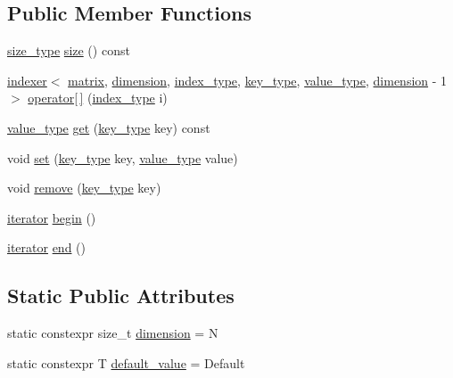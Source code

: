 \subsection*{Public Member Functions}
\begin{DoxyCompactItemize}
\item 
\hyperlink{structmatrix_a1a99bcb39d34cb8acd10a5d1a260542b}{size\+\_\+type} \hyperlink{structmatrix_abbe65fbc728f4958ad972a16d94716af}{size} () const
\item 
\hyperlink{structindexer}{indexer}$<$ \hyperlink{structmatrix}{matrix}, \hyperlink{structmatrix_ad9335b977ea0dfdd152314be10591379}{dimension}, \hyperlink{structmatrix_aa800607a99454f7d958b4d6565ca9751}{index\+\_\+type}, \hyperlink{structmatrix_ae7906bda02f5d7f6744d9545c9465e13}{key\+\_\+type}, \hyperlink{structmatrix_aeb660563444929ee10d8a0b06d42a951}{value\+\_\+type}, \hyperlink{structmatrix_ad9335b977ea0dfdd152314be10591379}{dimension} -\/ 1 $>$ \hyperlink{structmatrix_ac66c50d40fa11e89c81197da2499fe1b}{operator\mbox{[}$\,$\mbox{]}} (\hyperlink{structmatrix_aa800607a99454f7d958b4d6565ca9751}{index\+\_\+type} i)
\item 
\hyperlink{structmatrix_aeb660563444929ee10d8a0b06d42a951}{value\+\_\+type} \hyperlink{structmatrix_aad49d80cac29534744086e5e75e5d546}{get} (\hyperlink{structmatrix_ae7906bda02f5d7f6744d9545c9465e13}{key\+\_\+type} key) const
\item 
void \hyperlink{structmatrix_aaeb0f5223d18966172e12cdf35a8edb0}{set} (\hyperlink{structmatrix_ae7906bda02f5d7f6744d9545c9465e13}{key\+\_\+type} key, \hyperlink{structmatrix_aeb660563444929ee10d8a0b06d42a951}{value\+\_\+type} value)
\item 
void \hyperlink{structmatrix_ad6425b600ba5769251df32fb27a49827}{remove} (\hyperlink{structmatrix_ae7906bda02f5d7f6744d9545c9465e13}{key\+\_\+type} key)
\item 
\hyperlink{structmatrix_1_1iterator}{iterator} \hyperlink{structmatrix_aa89133051ced06904a790d03b7b11fea}{begin} ()
\item 
\hyperlink{structmatrix_1_1iterator}{iterator} \hyperlink{structmatrix_ae53919855895643ac043280793075c6d}{end} ()
\end{DoxyCompactItemize}
\subsection*{Static Public Attributes}
\begin{DoxyCompactItemize}
\item 
static constexpr size\+\_\+t \hyperlink{structmatrix_ad9335b977ea0dfdd152314be10591379}{dimension} = N
\item 
static constexpr T \hyperlink{structmatrix_a4ef29fe79b527f2ca6c6004dc56957fa}{default\+\_\+value} = Default
\end{DoxyCompactItemize}


